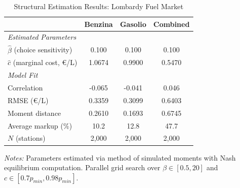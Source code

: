 \begin{table}[htbp]
  \centering
  \caption{Structural Estimation Results: Lombardy Fuel Market}
  \label{tab:estimation_results}
  \begin{threeparttable}
    \begin{tabular}{lccc}
      \hline\hline
      & Benzina & Gasolio & Combined \\
      \hline
      \multicolumn{4}{l}{\textit{Estimated Parameters}} \\[2pt]
      $\hat{\beta}$ (choice sensitivity) & 0.100 & 0.100 & 0.100 \\
      $\hat{c}$ (marginal cost, \euro/L) & 1.0674 & 0.9900 & 0.5470 \\
      \hline
      \multicolumn{4}{l}{\textit{Model Fit}} \\[2pt]
      Correlation & -0.065 & -0.041 & 0.046 \\
      RMSE (\euro/L) & 0.3359 & 0.3099 & 0.6403 \\
      Moment distance & 0.2610 & 0.1693 & 0.6745 \\
      \hline
      Average markup (\%) & 10.2 & 12.8 & 47.7 \\
      $N$ (stations) & 2,000 & 2,000 & 2,000 \\
      \hline\hline
    \end{tabular}
    \begin{tablenotes}
      \small
    \item \textit{Notes:} Parameters estimated via method of simulated moments with Nash equilibrium computation. Parallel grid search over $\beta \in [0.5, 20]$ and $c \in [0.7p_{min}, 0.98p_{min}]$.
    \end{tablenotes}
  \end{threeparttable}
\end{table}
